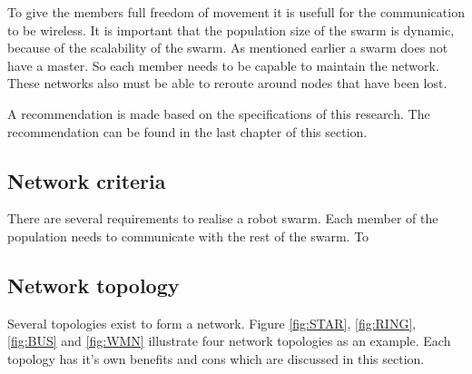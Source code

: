 \documentclass[10pt,a4paper]{article}
\begin{document}
To give the members full freedom of movement it is usefull for the communication to be wireless. It is important that the population size of the swarm is dynamic, because of the scalability of the swarm. As mentioned earlier a swarm does not have a master. So each member needs to be capable to maintain the network. These networks also must be able to reroute around nodes that have been lost. \cite{Swarmwiki}\cite{swarmintelligence}

A recommendation is made based on the specifications of this research. The recommendation can be found in the last chapter of this section.

\subsection{Network criteria}
There are several requirements to realise a robot swarm. Each member of the population needs to communicate with the rest of the swarm. To

\newpage
\subsection{Network topology}
Several topologies exist to form a network. Figure \ref{fig:STAR}, \ref{fig:RING}, \ref{fig:BUS} and \ref{fig:WMN} illustrate four network topologies as an example. Each topology has it's own benefits and cons which are discussed in this section.
\end{document}
